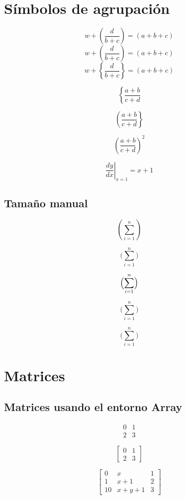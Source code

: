 \documentclass[12pt]{article}
\begin{document}
\section{Símbolos de agrupación}
\[ 
w + ( \frac{d}{b+c} )  = (a+b+c)
\]
\[ 
w + \left( \frac{d}{b+c} \right)  = (a+b+c)
\]
\[ 
w + \left\lbrace  \frac{d}{b+c} \right\rbrace   = (a+b+c)
\]

\[ 
\left\lbrace 
\frac{a+b}{c+d}
\right. 
\]

\begin{equation}
\left( 
\frac{a+b}{c+d}
\right\rbrace 
\end{equation}

\begin{equation}
\left( 
\frac{a+b}{c+d}
\right) ^{2}
\end{equation}

\begin{equation}
\left.
\frac{dy}{dx}
\right|_{x=1}=x+1
\end{equation}

\subsection{Tamaño manual}
\[
(\sum_{i=1}^n)
\]

\[
\bigl(
\sum_{i=1}^n
\bigr)
\]

\[
\Bigl(
\sum_{i=1}^n
\Bigr)
\]

\[
\biggl(
\sum_{i=1}^n
\biggr)
\]

\[
\Biggl(
\sum_{i=1}^n
\Biggr)
\]

\section{Matrices}
\subsection{Matrices usando el entorno Array}

\[
\begin{array}{lc}
0 & 1 \\
2 & 3
\end{array}
\]

\[
\left[ 
\begin{array}{lc}
0 & 1 \\
2 & 3
\end{array}
\right] 
\]

\[
\left[ 
\begin{array}{lrl}
0 & x & 1 \\
1 & x+1 & 2 \\ 
10 & x+y+1 & 3
\end{array}
\right] 
\]
\end{document}
